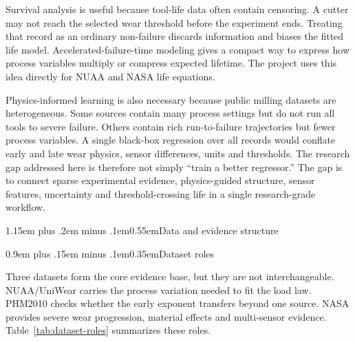 \documentclass[10pt]{article}
\makeatletter
\renewcommand\section{\@startsection{section}{1}{0pt}%
  {1.15em plus .2em minus .1em}{0.55em}{\normalfont\normalsize\bfseries}}
\renewcommand\subsection{\@startsection{subsection}{2}{0pt}%
  {0.9em plus .15em minus .1em}{0.35em}{\normalfont\small\bfseries}}
\makeatother
\begin{document}
Survival analysis is useful because tool-life data often contain censoring. A cutter may not reach the selected wear threshold before the experiment ends. Treating that record as an ordinary non-failure discards information and biases the fitted life model. Accelerated-failure-time modeling gives a compact way to express how process variables multiply or compress expected lifetime. The project uses this idea directly for NUAA and NASA life equations.

Physics-informed learning is also necessary because public milling datasets are heterogeneous. Some sources contain many process settings but do not run all tools to severe failure. Others contain rich run-to-failure trajectories but fewer process variables. A single black-box regression over all records would conflate early and late wear physics, sensor differences, units and thresholds. The research gap addressed here is therefore not simply ``train a better regressor.'' The gap is to connect sparse experimental evidence, physics-guided structure, sensor features, uncertainty and threshold-crossing life in a single research-grade workflow.

\section{Data and evidence structure}

\subsection{Dataset roles}

Three datasets form the core evidence base, but they are not interchangeable. NUAA/UniWear carries the process variation needed to fit the load law. PHM2010 checks whether the early exponent transfers beyond one source. NASA provides severe wear progression, material effects and multi-sensor evidence. Table~\ref{tab:dataset-roles} summarizes these roles.
\end{document}
